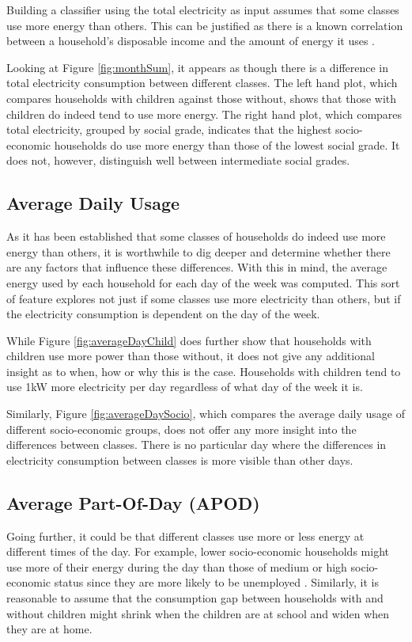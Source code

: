 Building a classifier using the total electricity as input assumes that some classes use more energy than others. This can be justified as there is a known correlation between a household's disposable income and the amount of energy it uses \cite{Gomez}.

\monthSum %

Looking at Figure \ref{fig:monthSum}, it appears as though there is a difference in total electricity consumption between different classes. The left hand plot, which compares households with children against those without, shows that those with children do indeed tend to use more energy. The right hand plot, which compares total electricity, grouped by social grade, indicates that the highest socio-economic households do use more energy than those of the lowest social grade. It does not, however, distinguish well between intermediate social grades.

\subsection*{Average Daily Usage}
As it has been established that some classes of households do indeed use more energy than others, it is worthwhile to dig deeper and determine whether there are any factors that influence these differences. With this in mind, the average energy used by each household for each day of the week was computed. This sort of feature explores not just if some classes use more electricity than others, but if the electricity consumption is dependent on the day of the week. 

\averageDayChild %
\averageDaySocio %

While Figure \ref{fig:averageDayChild} does further show that households with children use more power than those without, it does not give any additional insight as to when, how or why this is the case. Households with children tend to use 1kW more electricity per day regardless of what day of the week it is.

Similarly, Figure \ref{fig:averageDaySocio}, which compares the average daily usage of different socio-economic groups, does not offer any more insight into the differences between classes. There is no particular day where the differences in electricity consumption between classes is more visible than other days.

\subsection*{Average Part-Of-Day (APOD)}
Going further, it could be that different classes use more or less energy at different times of the day. For example, lower socio-economic households might use more of their energy during the day than those of medium or high socio-economic status since they are more likely to be unemployed \cite{Bartley}. Similarly, it is reasonable to assume that the consumption gap between households with and without children might shrink when the children are at school and widen when they are at home.

